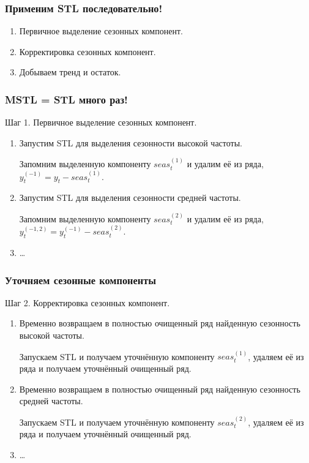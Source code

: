\begin{frame}
  \frametitle{Применим STL последовательно!}

  \begin{enumerate}[<+->]
    \item \alert{Первичное} выделение сезонных компонент. 
    \item \alert{Корректировка} сезонных компонент. 
    \item Добываем тренд и остаток. 
  \end{enumerate}

\end{frame}



\begin{frame}
  \frametitle{MSTL = STL много раз!}

  Шаг 1. Первичное выделение сезонных компонент. 

  \begin{enumerate}[<+->]
    \item Запустим STL для выделения сезонности \alert{высокой частоты}. 
    
    Запомним выделенную компоненту $seas_t^{(1)}$ и удалим её из ряда, $y_t^{(-1)} = y_t - seas_t^{(1)}$. 

    \item Запустим STL для выделения сезонности \alert{средней частоты}. 
    
    Запомним выделенную компоненту $seas_t^{(2)}$ и удалим её из ряда, $y_t^{(-1,2)}= y_t^{(-1)} - seas_t^{(2)}$. 

    \item \ldots

  \end{enumerate}

\end{frame}



\begin{frame}
  \frametitle{Уточняем сезонные компоненты}

  Шаг 2. Корректировка сезонных компонент. 

  \begin{enumerate}[<+->]
    \item Временно \alert{возвращаем} в полностью очищенный ряд найденную \alert{сезонность} высокой частоты.
    
    Запускаем STL и получаем \alert{уточнённую компоненту} $seas_t^{(1)}$, удаляем её из ряда и получаем \alert{уточнённый очищенный ряд}. 

    \item Временно \alert{возвращаем} в полностью очищенный ряд найденную \alert{сезонность} средней частоты.
    
    Запускаем STL и получаем \alert{уточнённую компоненту} $seas_t^{(2)}$, удаляем её из ряда и получаем \alert{уточнённый очищенный ряд}. 

    \item \ldots

  \end{enumerate}

\end{frame}



